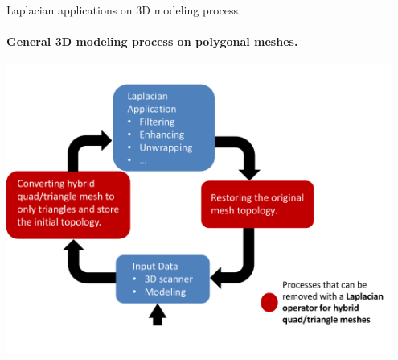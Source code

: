 \documentclass[10pt, compress, english]{beamer}
\begin{document}
\begin{frame}{Laplacian applications on 3D modeling process}


\framesubtitle{General 3D modeling process on polygonal meshes.}


\begin{center}
\includegraphics[bb=0bp 0bp 720bp 500bp,clip,width=0.95\textwidth]{img/ModelingProcess}
\par\end{center}

\end{frame}
\end{document}
